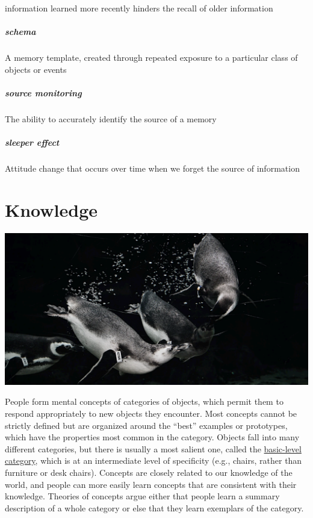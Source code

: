 \documentclass[
]{krantz}
\begin{document}
information learned more recently hinders the recall of older information

\paragraph*{schema}\label{schema}

A memory template, created through repeated exposure to a particular class of objects or events

\paragraph*{source monitoring}\label{source-monitoring-1}

The ability to accurately identify the source of a memory

\paragraph*{sleeper effect}\label{sleeper-effect}

Attitude change that occurs over time when we forget the source of information

\chapter{Knowledge}\label{knowledge}

\begin{center}\includegraphics[width=1\linewidth]{images/ch7/cover-penguins} \end{center}

People form mental concepts of categories of objects, which permit them to respond appropriately to new objects they encounter. Most concepts cannot be strictly defined but are organized around the ``best'' examples or prototypes, which have the properties most common in the category. Objects fall into many different categories, but there is usually a most salient one, called the \hyperref[basic-level-category]{basic-level category}, which is at an intermediate level of specificity (e.g., chairs, rather than furniture or desk chairs). Concepts are closely related to our knowledge of the world, and people can more easily learn concepts that are consistent with their knowledge. Theories of concepts argue either that people learn a summary description of a whole category or else that they learn exemplars of the category.
\end{document}
